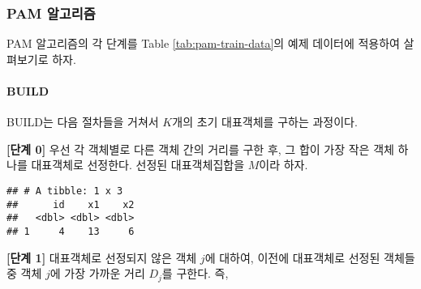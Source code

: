 \documentclass[]{book}
\newenvironment{Shaded}{\begin{snugshade}}{\end{snugshade}}
\newcommand{\DataTypeTok}[1]{\textcolor[rgb]{0.13,0.29,0.53}{#1}}
\newcommand{\DecValTok}[1]{\textcolor[rgb]{0.00,0.00,0.81}{#1}}
\newcommand{\KeywordTok}[1]{\textcolor[rgb]{0.13,0.29,0.53}{\textbf{#1}}}
\newcommand{\NormalTok}[1]{#1}
\newcommand{\OperatorTok}[1]{\textcolor[rgb]{0.81,0.36,0.00}{\textbf{#1}}}
\newcommand{\OtherTok}[1]{\textcolor[rgb]{0.56,0.35,0.01}{#1}}
\newcommand{\StringTok}[1]{\textcolor[rgb]{0.31,0.60,0.02}{#1}}
\let\oldparagraph\paragraph
\renewcommand{\paragraph}[1]{\oldparagraph{#1}\mbox{}}
\begin{document}
\hypertarget{pam-algorithm}{%
\subsubsection{PAM 알고리즘}\label{pam-algorithm}}

PAM 알고리즘의 각 단계를 Table \ref{tab:pam-train-data}의 예제 데이터에 적용하여 살펴보기로 하자.

\hypertarget{pam-build}{%
\paragraph{BUILD}\label{pam-build}}

BUILD는 다음 절차들을 거쳐서 \(K\)개의 초기 대표객체를 구하는 과정이다.

\textbf{{[}단계 0{]}} 우선 각 객체별로 다른 객체 간의 거리를 구한 후, 그 합이 가장 작은 객체 하나를 대표객체로 선정한다. 선정된 대표객체집합을 \(M\)이라 하자.

\begin{Shaded}
\end{Shaded}

\begin{verbatim}
## # A tibble: 1 x 3
##      id    x1    x2
##   <dbl> <dbl> <dbl>
## 1     4    13     6
\end{verbatim}

\textbf{{[}단계 1{]}} 대표객체로 선정되지 않은 객체 \(j\)에 대하여, 이전에 대표객체로 선정된 객체들 중 객체 \(j\)에 가장 가까운 거리 \(D_j\)를 구한다. 즉,
\end{document}
